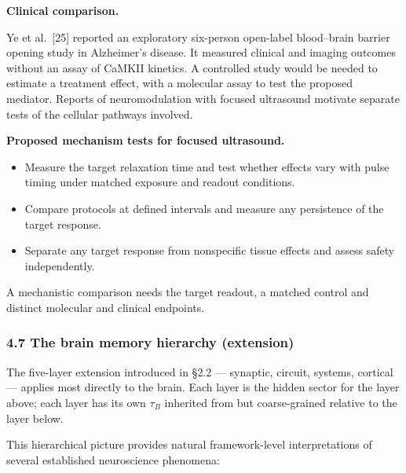 \documentclass[
]{article}
\providecommand{\tightlist}{%
  \setlength{\itemsep}{0pt}\setlength{\parskip}{0pt}}
\begin{document}
\textbf{Clinical comparison.}

Ye et al.~{[}25{]} reported an exploratory six-person open-label
blood--brain barrier opening study in Alzheimer's disease. It measured
clinical and imaging outcomes without an assay of CaMKII kinetics. A
controlled study would be needed to estimate a treatment effect, with a
molecular assay to test the proposed mediator. Reports of
neuromodulation with focused ultrasound motivate separate tests of the
cellular pathways involved.

\textbf{Proposed mechanism tests for focused ultrasound.}

\begin{itemize}
\tightlist
\item
  Measure the target relaxation time and test whether effects vary with
  pulse timing under matched exposure and readout conditions.
\item
  Compare protocols at defined intervals and measure any persistence of
  the target response.
\item
  Separate any target response from nonspecific tissue effects and
  assess safety independently.
\end{itemize}

A mechanistic comparison needs the target readout, a matched control and
distinct molecular and clinical endpoints.

\hypertarget{the-brain-memory-hierarchy-extension}{%
\subsubsection{4.7 The brain memory hierarchy
(extension)}\label{the-brain-memory-hierarchy-extension}}

The five-layer extension introduced in §2.2 --- synaptic, circuit,
systems, cortical --- applies most directly to the brain. Each layer is
the hidden sector for the layer above; each layer has its own \(\tau_B\)
inherited from but coarse-grained relative to the layer below.

This hierarchical picture provides natural framework-level
interpretations of several established neuroscience phenomena:
\end{document}
